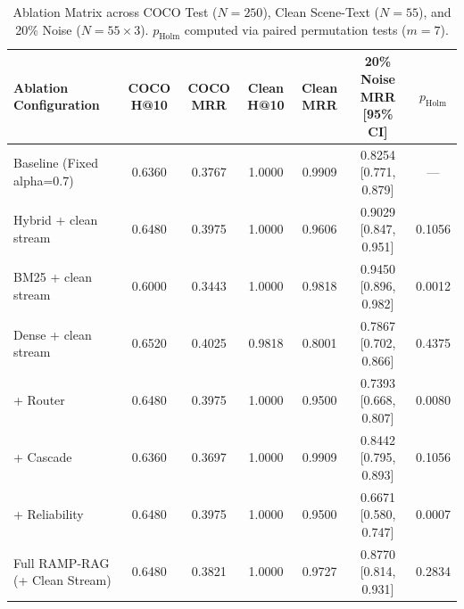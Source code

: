 \begin{table}[t]
\centering
\caption{Ablation Matrix across COCO Test ($N=250$), Clean Scene-Text ($N=55$), and 20\% Noise ($N=55\times 3$). $p_{\text{Holm}}$ computed via paired permutation tests ($m=7$).}
\label{tab:ablation_a1}
\begin{tabular}{lcccccc}
\hline
\textbf{Ablation Configuration} & \textbf{COCO H@10} & \textbf{COCO MRR} & \textbf{Clean H@10} & \textbf{Clean MRR} & \textbf{20\% Noise MRR [95\% CI]} & \textbf{$p_{\text{Holm}}$} \\
\hline
Baseline (Fixed alpha=0.7) & 0.6360 & 0.3767 & 1.0000 & 0.9909 & 0.8254 [0.771, 0.879] & --- \\
Hybrid + clean stream & 0.6480 & 0.3975 & 1.0000 & 0.9606 & 0.9029 [0.847, 0.951] & 0.1056 \\
BM25 + clean stream & 0.6000 & 0.3443 & 1.0000 & 0.9818 & 0.9450 [0.896, 0.982] & 0.0012 \\
Dense + clean stream & 0.6520 & 0.4025 & 0.9818 & 0.8001 & 0.7867 [0.702, 0.866] & 0.4375 \\
+ Router & 0.6480 & 0.3975 & 1.0000 & 0.9500 & 0.7393 [0.668, 0.807] & 0.0080 \\
+ Cascade & 0.6360 & 0.3697 & 1.0000 & 0.9909 & 0.8442 [0.795, 0.893] & 0.1056 \\
+ Reliability & 0.6480 & 0.3975 & 1.0000 & 0.9500 & 0.6671 [0.580, 0.747] & 0.0007 \\
Full RAMP-RAG (+ Clean Stream) & 0.6480 & 0.3821 & 1.0000 & 0.9727 & 0.8770 [0.814, 0.931] & 0.2834 \\
\hline
\end{tabular}
\end{table}

